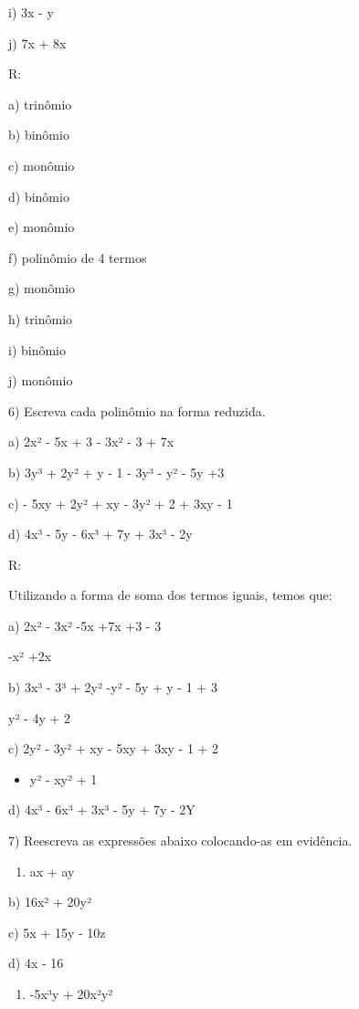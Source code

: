 i) 3x - y

j) 7x + 8x

R:

a) trinômio

b) binômio

c) monômio

d) binômio

e) monômio

f) polinômio de 4 termos

g) monômio

h) trinômio

i) binômio

j) monômio

6) Escreva cada polinômio na forma reduzida.

a) 2x² - 5x + 3 - 3x² - 3 + 7x

b) 3y³ + 2y² + y - 1 - 3y³ - y² - 5y +3

c) - 5xy + 2y² + xy - 3y² + 2 + 3xy - 1

d) 4x³ - 5y - 6x³ + 7y + 3x³ - 2y

R:

Utilizando a forma de soma dos termos iguais, temos que:

a) 2x² - 3x² -5x +7x +3 - 3

-x² +2x

b) 3x³ - 3³ + 2y² -y² - 5y + y - 1 + 3

y² - 4y + 2

c) 2y² - 3y² + xy - 5xy + 3xy - 1 + 2

\begin{itemize}
\tightlist
\item
  y² - xy² + 1
\end{itemize}

d) 4x³ - 6x³ + 3x³ - 5y + 7y - 2Y

7) Reescreva as expressões abaixo colocando-as em evidência.

\begin{enumerate}
\def\labelenumi{\alph{enumi})}
\tightlist
\item
  ax + ay
\end{enumerate}

b) 16x² + 20y²

c) 5x + 15y - 10z

d) 4x - 16

\begin{enumerate}
\def\labelenumi{\alph{enumi})}
\setcounter{enumi}{4}
\tightlist
\item
  -5x³y + 20x²y²
\end{enumerate}

